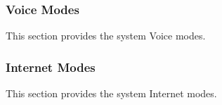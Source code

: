 \subsubsection{Voice Modes}
\label{loc:VoiceModes}

This section provides the system Voice modes.




\subsubsection{Internet Modes}
\label{loc:InternetModes}

This section provides the system Internet modes.


